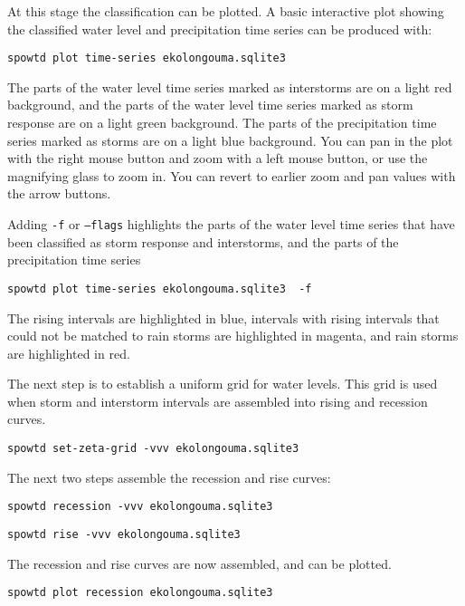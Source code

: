 \documentclass[11pt,a4paper]{article}
\begin{document}
At this stage the classification can be plotted.  A basic interactive
plot showing the classified water level and precipitation time series
can be produced with:
\begin{lstlisting}[frame=single]
spowtd plot time-series ekolongouma.sqlite3
\end{lstlisting}
The parts of the water level time series marked as interstorms are on
a light red background, and the parts of the water level time series
marked as storm response are on a light green background.  The parts
of the precipitation time series marked as storms are on a light blue
background.  You can pan in the plot with the right mouse button and
zoom with a left mouse button, or use the magnifying glass to zoom in.
You can revert to earlier zoom and pan values with the arrow buttons.

Adding \texttt{-f} or \texttt{--flags} highlights the parts of the
water level time series that have been classified as storm response
and interstorms, and the parts of the precipitation time series
\begin{lstlisting}[frame=single]
spowtd plot time-series ekolongouma.sqlite3  -f
\end{lstlisting}
The rising intervals are highlighted in blue, intervals with rising
intervals that could not be matched to rain storms are highlighted in
magenta, and rain storms are highlighted in red.

The next step is to establish a uniform grid for water levels.  This
grid is used when storm and interstorm intervals are assembled into
rising and recession curves.
\begin{lstlisting}[frame=single]
spowtd set-zeta-grid -vvv ekolongouma.sqlite3
\end{lstlisting}

The next two steps assemble the recession and rise curves:
\begin{lstlisting}[frame=single]
spowtd recession -vvv ekolongouma.sqlite3
\end{lstlisting}

\begin{lstlisting}[frame=single]
spowtd rise -vvv ekolongouma.sqlite3
\end{lstlisting}

The recession and rise curves are now assembled, and can be plotted.
\begin{lstlisting}[frame=single]
spowtd plot recession ekolongouma.sqlite3
\end{lstlisting}
\end{document}
